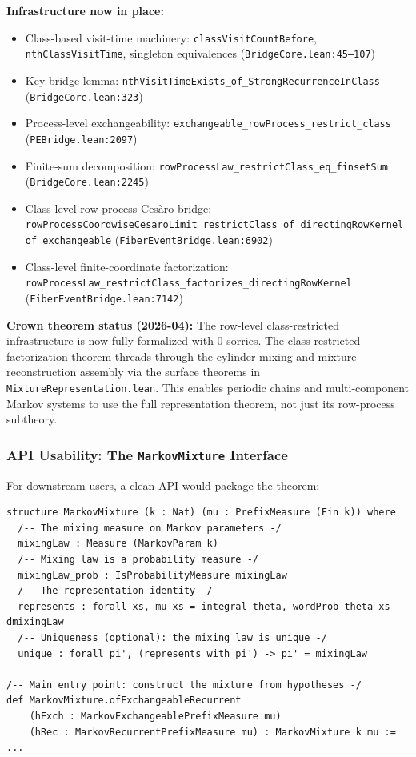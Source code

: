 \documentclass[11pt,a4paper]{article}
\theoremstyle{definition}
\begin{document}
\noindent\textbf{Infrastructure now in place:}
\begin{itemize}
\item Class-based visit-time machinery: \texttt{classVisitCountBefore},
  \texttt{nthClassVisitTime}, singleton equivalences
  (\texttt{BridgeCore.lean:45--107})
\item Key bridge lemma: \texttt{nthVisitTimeExists\_of\_StrongRecurrenceInClass}
  (\texttt{BridgeCore.lean:323})
\item Process-level exchangeability: \texttt{exchangeable\_rowProcess\_restrict\_class}
  (\texttt{PEBridge.lean:2097})
\item Finite-sum decomposition: \texttt{rowProcessLaw\_restrictClass\_eq\_finsetSum}
  (\texttt{BridgeCore.lean:2245})
\item Class-level row-process Ces\`aro bridge:
  \texttt{rowProcessCoordwiseCesaroLimit\_restrictClass\_of\_directingRowKernel\_of\_exchangeable}
  (\texttt{FiberEventBridge.lean:6902})
\item Class-level finite-coordinate factorization:
  \texttt{rowProcessLaw\_restrictClass\_factorizes\_directingRowKernel}
  (\texttt{FiberEventBridge.lean:7142})
\end{itemize}

\noindent\textbf{Crown theorem status (2026-04):} The row-level class-restricted
infrastructure is now fully formalized with 0 sorries. The class-restricted
factorization theorem threads through the cylinder-mixing and mixture-reconstruction
assembly via the surface theorems in \texttt{MixtureRepresentation.lean}. This
enables periodic chains and multi-component Markov systems to use the full
representation theorem, not just its row-process subtheory.

\subsubsection{API Usability: The \texttt{MarkovMixture} Interface}

For downstream users, a clean API would package the theorem:

\begin{lstlisting}
structure MarkovMixture (k : Nat) (mu : PrefixMeasure (Fin k)) where
  /-- The mixing measure on Markov parameters -/
  mixingLaw : Measure (MarkovParam k)
  /-- Mixing law is a probability measure -/
  mixingLaw_prob : IsProbabilityMeasure mixingLaw
  /-- The representation identity -/
  represents : forall xs, mu xs = integral theta, wordProb theta xs dmixingLaw
  /-- Uniqueness (optional): the mixing law is unique -/
  unique : forall pi', (represents_with pi') -> pi' = mixingLaw

/-- Main entry point: construct the mixture from hypotheses -/
def MarkovMixture.ofExchangeableRecurrent
    (hExch : MarkovExchangeablePrefixMeasure mu)
    (hRec : MarkovRecurrentPrefixMeasure mu) : MarkovMixture k mu := ...
\end{lstlisting}
\end{document}
